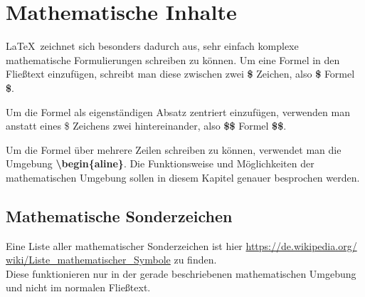 \documentclass[a4paper, 12pt]{scrreprt}
\begin{document}
\chapter{Mathematische Inhalte}
\LaTeX\, zeichnet sich besonders dadurch aus, sehr einfach komplexe mathematische Formulierungen schreiben zu können. Um eine Formel in den Fließtext einzufügen, schreibt man diese zwischen zwei \textbf{\$} Zeichen, also \textbf{\$} Formel \textbf{\$}.

Um die Formel als eigenständigen Absatz zentriert einzufügen, verwenden man anstatt eines \$ Zeichens zwei hintereinander, also \textbf{\$\$} Formel \textbf{\$\$}. 

Um die Formel über mehrere Zeilen schreiben zu können, verwendet man die Umgebung \textbf{\textbackslash begin\{aline\}}. Die Funktionsweise und Möglichkeiten der mathematischen Umgebung sollen in diesem Kapitel genauer besprochen werden.
\section{Mathematische Sonderzeichen}
Eine Liste aller mathematischer Sonderzeichen ist hier \href{https://de.wikipedia.org/wiki/Liste_mathematischer_Symbole}{https://de.wikipedia.org/\\wiki/Liste\_mathematischer\_Symbole} zu finden.\\
Diese funktionieren nur in der gerade beschriebenen mathematischen Umgebung und nicht im normalen Fließtext.
\end{document}
